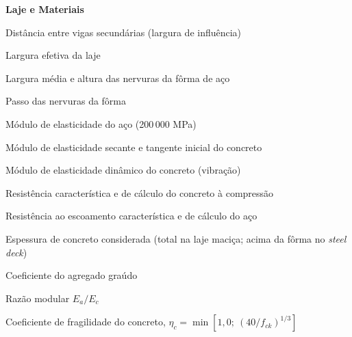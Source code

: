 \begin{simbolos}
  \item[] \textbf{Laje e Materiais}
  \item[$b$] Distância entre vigas secundárias (largura de influência)
  \item[$b_{ef}$] Largura efetiva da laje
  \item[$b_F, h_F$] Largura média e altura das nervuras da fôrma de aço
  \item[$e_F$] Passo das nervuras da fôrma
  \item[$E_a$] Módulo de elasticidade do aço (200\,000 MPa)
  \item[$E_c, E_{ci}$] Módulo de elasticidade secante e tangente inicial do concreto
  \item[$E_{c,din}$] Módulo de elasticidade dinâmico do concreto (vibração)
  \item[$f_{ck}, f_{cd}$] Resistência característica e de cálculo do concreto à compressão
  \item[$f_y, f_{yd}$] Resistência ao escoamento característica e de cálculo do aço
  \item[$t_c$] Espessura de concreto considerada (total na laje maciça; acima da fôrma no \emph{steel deck})
  \item[$\alpha_{ag}$] Coeficiente do agregado graúdo
  \item[$\alpha_E$] Razão modular $E_a/E_c$
  \item[$\eta_c$] Coeficiente de fragilidade do concreto, $\eta_c = \min[1{,}0;\ (40/f_{ck})^{1/3}]$


\end{simbolos}
